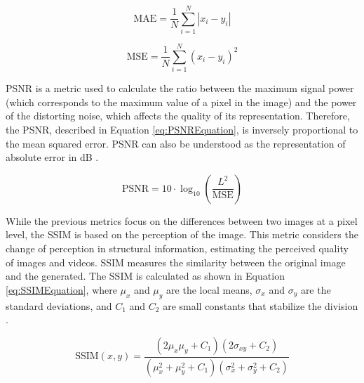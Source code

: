 \begin{equation}
	\text{MAE} = \frac{1}{N} \sum_{i=1}^{N} |x_i - y_i|
	\label{eq:MAEEquation}
\end{equation}

\begin{equation}
	\text{MSE} = \frac{1}{N} \sum_{i=1}^{N} \left( x_i - y_i \right)^{2}
	\label{eq:MSEEquation}
\end{equation}

PSNR is a metric used to calculate the ratio between the maximum signal power (which corresponds to the maximum value of a pixel in the image) and the power of the distorting noise, which affects the quality of its representation. Therefore, the PSNR, described in Equation \ref{eq:PSNREquation}, is inversely proportional to the mean squared error. PSNR can also be understood as the representation of absolute error in dB \parencite{Sara2019}.

\begin{equation}
	\text{PSNR} = 10 \cdot \log_{10} \left( \frac{L^2}{\text{MSE}} \right)
	\label{eq:PSNREquation}
\end{equation}

While the previous metrics focus on the differences between two images at a pixel level, the SSIM is based on the perception of the image. This metric considers the change of perception in structural information, estimating the perceived quality of images and videos. SSIM measures the similarity between the original image and the generated. The SSIM is calculated as shown in Equation \ref{eq:SSIMEquation}, where $\mu_{x}$ and $\mu_{y}$ are the local means, $\sigma_{x}$ and $\sigma_{y}$ are the standard deviations, and $C_{1}$ and $C_{2}$ are small constants that stabilize the division \parencite{Sara2019}.

\begin{equation}
	\text{SSIM}(x, y) = \frac{(2\mu_x \mu_y + C_1)(2\sigma_{xy} + C_2)}{(\mu_x^2 + \mu_y^2 + C_1)(\sigma_x^2 + \sigma_y^2 + C_2)}
	\label{eq:SSIMEquation}
\end{equation}

